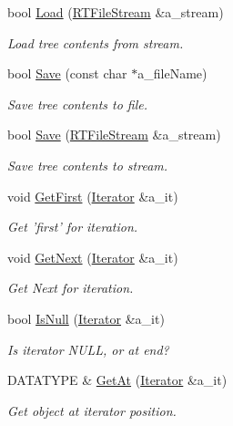 \begin{DoxyCompactItemize}
bool \hyperlink{classRTree_ad02dc25a34d9b5b291c8ff3f1b002b09}{Load} (\hyperlink{classRTFileStream}{R\-T\-File\-Stream} \&a\-\_\-stream)
\begin{DoxyCompactList}\small\item\em Load tree contents from stream. \end{DoxyCompactList}\item 
bool \hyperlink{classRTree_a6817692e1e8e416843be1ea628f7a074}{Save} (const char $\ast$a\-\_\-file\-Name)
\begin{DoxyCompactList}\small\item\em Save tree contents to file. \end{DoxyCompactList}\item 
bool \hyperlink{classRTree_a7066ea753180537a3a870c84e4fcefce}{Save} (\hyperlink{classRTFileStream}{R\-T\-File\-Stream} \&a\-\_\-stream)
\begin{DoxyCompactList}\small\item\em Save tree contents to stream. \end{DoxyCompactList}\item 
void \hyperlink{classRTree_acbcbd987b4f6549cd53e373e01b74efa}{Get\-First} (\hyperlink{classRTree_1_1Iterator}{Iterator} \&a\-\_\-it)
\begin{DoxyCompactList}\small\item\em Get 'first' for iteration. \end{DoxyCompactList}\item 
void \hyperlink{classRTree_a41da97d27b44e7d7e852150ced23a610}{Get\-Next} (\hyperlink{classRTree_1_1Iterator}{Iterator} \&a\-\_\-it)
\begin{DoxyCompactList}\small\item\em Get Next for iteration. \end{DoxyCompactList}\item 
bool \hyperlink{classRTree_a8b8c51698e5b8df1e715650a43aad7f4}{Is\-Null} (\hyperlink{classRTree_1_1Iterator}{Iterator} \&a\-\_\-it)
\begin{DoxyCompactList}\small\item\em Is iterator N\-U\-L\-L, or at end? \end{DoxyCompactList}\item 
D\-A\-T\-A\-T\-Y\-P\-E \& \hyperlink{classRTree_aab228fbd816b5e5c93666c37b47635f3}{Get\-At} (\hyperlink{classRTree_1_1Iterator}{Iterator} \&a\-\_\-it)
\begin{DoxyCompactList}\small\item\em Get object at iterator position. \end{DoxyCompactList}\end{DoxyCompactItemize}
